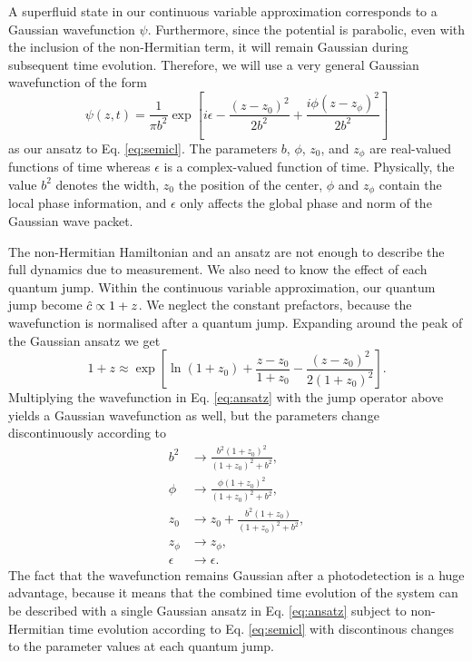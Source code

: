 A superfluid state in our continuous variable approximation
corresponds to a Gaussian wavefunction $\psi$. Furthermore, since the
potential is parabolic, even with the inclusion of the non-Hermitian
term, it will remain Gaussian during subsequent time
evolution. Therefore, we will use a very general Gaussian wavefunction
of the form
\begin{equation}
  \label{eq:ansatz}
  \psi(z, t) = \frac{1}{\pi b^2}\exp\left[ i \epsilon 
  - \frac{(z - z_0)^2} {2 b^2} + \frac{i \phi (z - z_\phi)^2} {2 b^2} \right]
\end{equation}
as our ansatz to Eq. \eqref{eq:semicl}. The parameters $b$, $\phi$,
$z_0$, and $z_\phi$ are real-valued functions of time whereas
$\epsilon$ is a complex-valued function of time. Physically, the value
$b^2$ denotes the width, $z_0$ the position of the center, $\phi$ and
$z_\phi$ contain the local phase information, and $\epsilon$ only
affects the global phase and norm of the Gaussian wave packet.

The non-Hermitian Hamiltonian and an ansatz are not enough to describe
the full dynamics due to measurement. We also need to know the effect
of each quantum jump. Within the continuous variable approximation,
our quantum jump become $\hat{c} \propto 1 + z$. We neglect the constant
prefactors, because the wavefunction is normalised after a quantum
jump. Expanding around the peak of the Gaussian ansatz we get
\begin{equation}
  1 + z \approx \exp \left[ \ln (1 + z_0) + \frac{z - z_0}{1 + z_0} -
    \frac{(z - z_0)^2}{2 (1 + z_0)^2} \right].
\end{equation}
Multiplying the wavefunction in Eq. \eqref{eq:ansatz} with the jump
operator above yields a Gaussian wavefunction as well, but the
parameters change discontinuously according to
\begingroup
\allowdisplaybreaks
\begin{align}
  \label{eq:jumpb2}
  b^2 & \rightarrow \frac{ b^2 (1 + z_0)^2 } { (1 + z_0)^2 + b^2 }, \\
  \phi & \rightarrow \frac{ \phi (1 + z_0)^2 } { (1 + z_0)^2 + b^2 }, \\
  \label{eq:jumpz0}
  z_0 & \rightarrow z_0 + \frac{ b^2 (1 + z_0) } { (1 + z_0)^2 + b^2}, \\
  z_\phi & \rightarrow z_\phi, \\
  \epsilon & \rightarrow \epsilon.
\end{align}
\endgroup
The fact that the wavefunction remains Gaussian after a photodetection
is a huge advantage, because it means that the combined time evolution
of the system can be described with a single Gaussian ansatz in
Eq. \eqref{eq:ansatz} subject to non-Hermitian time evolution
according to Eq. \eqref{eq:semicl} with discontinous changes to the
parameter values at each quantum jump.

